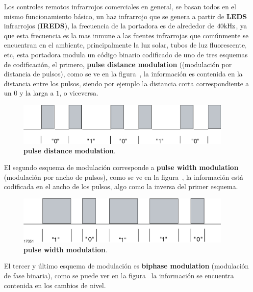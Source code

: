 
Los controles remotos infrarrojos comerciales en general, se basan todos en el mismo funcionamiento básico, un haz infrarrojo que se genera a partir de \textbf{LEDS} infrarrojos (\textbf{IREDS}), la frecuencia de la portadora es de alrededor de $40 \si[per-mode=symbol]{\kilo\hertz}$, ya que esta frecuencia es la mas inmune a las fuentes infrarrojas que comúnmente se encuentran en el ambiente, principalmente la luz solar, tubos de luz fluorescente, etc, esta portadora modula un código binario codificado de uno de tres esquemas de codificación, el primero, \textbf{pulse distance modulation} ((modulación por distancia de pulsos), como se ve en la figura~, la información es contenida en la distancia entre los pulsos, siendo por ejemplo la distancia corta correspondiente a un $0$ y la larga a $1$, o viceversa.

 

\begin{figure}[H]
	\centering
	\includegraphics[width=0.95\textwidth]{img/IR/pulse_distance.png}
	\caption{\footnotesize{\textbf{pulse distance modulation}.}}
	\label{fig:pulse_distance_modulation}
\end{figure}


El segundo esquema de modulación corresponde a \textbf{pulse width modulation} (modulación por ancho de pulsos), como se ve en la figura~, la información está codificada en el ancho de los pulsos, algo como la inversa del primer esquema.



\begin{figure}[H]
	\centering
	\includegraphics[width=0.95\textwidth]{img/IR/pulse_width.png}
	\caption{\footnotesize{\textbf{pulse width modulation}.}}
	\label{fig:pulse_width_modulation}
\end{figure}


El tercer y último esquema de modulación es \textbf{biphase modulation} (modulación de fase binaria), como se puede ver en la figura~ la información se encuentra contenida en los cambios de nivel.


